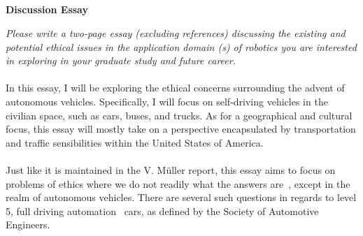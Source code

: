 \documentclass[12pt]{article}
\title{
    \vspace{2in}
    \textmd{\textbf{\hmwkClass\ \hmwkTitle}}\\
    \vspace{3in}
}
\author{\hmwkAuthorName}
\date{}
\begin{document}
\maketitle

\pagebreak

\begin{center}
    \large\textbf{Discussion Essay}
\end{center}

\textit{Please write a two-page essay (excluding references) discussing the existing and potential 
ethical issues in the application domain (s) of robotics you are interested in exploring in your 
graduate study and future career.}\\
\vspace{0in}\\
In this essay, I will be exploring the ethical concerns surrounding the advent of autonomous vehicles.
Specifically, I will focus on self-driving vehicles in the civilian space, such as cars, buses, and trucks.
As for a geographical and cultural focus, this essay will mostly take on a perspective encapsulated by 
transportation and traffic sensibilities within the United States of America.\\
\vspace{0in}\\
Just like it is maintained in the V. Müller report, this essay aims to focus on problems of ethics where
we do not readily what the answers are~\cite{sep-ethics-ai}, except in the realm of autonomous vehicles. 
There are several such questions in regards to level 5, full driving automation~\cite{SAE-levels} cars, as 
defined by the Society of Automotive Engineers.
\vspace{0in}\\
\lipsum[2]\\
\vspace{0in}\\
\lipsum[3]\\
\vspace{0in}\\
\lipsum[4]\\
\vspace{0in}\\
\lipsum[5]\\
\vspace{0in}\\
\lipsum[6]\\
\vspace{0in}\\
\lipsum[7]\\
\vspace{0in}\\
\lipsum[8]\\
\vspace{0in}\\
\lipsum[9]\\
\vspace{0in}\\
\lipsum[10]



\end{document}
